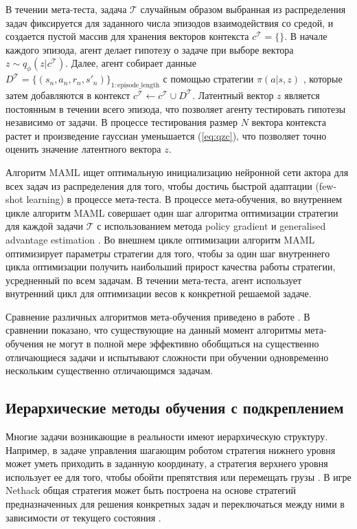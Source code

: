 В течении мета-теста, задача $\mathcal{T}$ случайным образом выбранная из распределения задач фиксируется для заданного числа эпизодов взаимодействия со средой, и создается пустой массив для хранения векторов контекста $c^\mathcal{T} = \{\}$. В начале каждого эпизода, агент делает гипотезу о задаче при выборе вектора  $z \sim q_{\phi}(z|c^\mathcal{T})$. Далее, агент собирает данные $D^\mathcal{T} = \{(s_{n}, a_{n}, r_{n}, s'_{n})\}_{1:{\mathrm{episode\_length}}}$ с помощью стратегии  $\pi(a| s, z)$ , которые затем добавляются в контекст $c^\mathcal{T} \leftarrow c^\mathcal{T} \cup D^\mathcal{T}$. 
Латентный вектор $z$ является постоянным в течении всего эпизода, что позволяет агенту тестировать гипотезы независимо от задачи. В процессе тестирования размер $N$ вектора контекста растет и произведение гауссиан уменьшается (\ref{eq:qzc}), что позволяет точно оценить значение латентного вектора $z$.

Алгоритм MAML ищет оптимальную инициализацию нейронной сети актора для всех задач из распределения для того, чтобы достичь быстрой адаптации (few-shot learning) в процессе мета-теста. В процессе мета-обучения, во внутреннем цикле алгоритм MAML совершает один шаг алгоритма оптимизации стратегии для каждой задачи $\mathcal{T}$ с использованием метода policy gradient и generalised advantage estimation \cite{gae}. 
Во внешнем цикле оптимизации алгоритм MAML оптимизирует параметры стратегии для того, чтобы за один шаг внутреннего цикла оптимизации получить наибольший прирост качества работы стратегии, усредненный по всем задачам. 
В течении мета-теста, агент использует внутренний цикл для оптимизации весов к конкретной решаемой задаче. 

Сравнение различных алгоритмов мета-обучения приведено в работе \cite{yu2020meta}. В сравнении показано, что существующие на данный момент алгоритмы мета-обучения не могут в полной мере эффективно обобщаться на существенно отличающиеся задачи и испытывают сложности при обучении одновременно нескольким существенно отличающимся задачам.

\subsection{Иерархические методы обучения с подкреплением}

Многие задачи возникающие в реальности имеют иерархическую структуру. Например, в задаче управления шагающим роботом стратегия нижнего уровня может уметь приходить в заданную координату, а стратегия верхнего уровня использует ее для того, чтобы обойти препятствия или перемещать грузы \cite{robel}. В игре Nethack общая стратегия может быть построена на основе стратегий предназначенных для решения конкретных задач и переключаться между ними в зависимости от текущего состояния \cite{confbib3}. 

